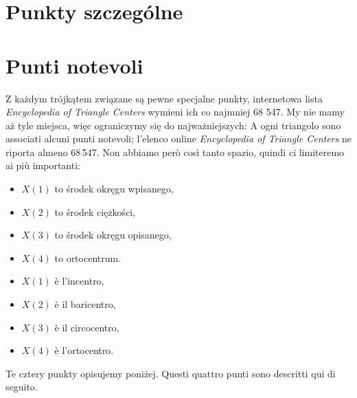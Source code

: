 
%

\section{Punkty szczególne} %
\section{Punti notevoli} %

Z każdym trójkątem związane są pewne specjalne punkty, internetowa lista \emph{Encyclopedia of Triangle Centers} wymieni ich co najmniej 68 547. %
My nie mamy aż tyle miejsca, więc ograniczymy się do najważniejszych: %
A ogni triangolo sono associati alcuni punti notevoli; l'elenco online \emph{Encyclopedia of Triangle Centers} ne riporta almeno 68\,547. %
Non abbiamo però così tanto spazio, quindi ci limiteremo ai più importanti: %
\begin{itemize}
\item $X(1)$ to środek okręgu wpisanego, %
\item $X(2)$ to środek ciężkości, %
\item $X(3)$ to środek okręgu opisanego, %
\item $X(4)$ to ortocentrum. %
\item $X(1)$ è l'incentro, %
\item $X(2)$ è il baricentro, %
\item $X(3)$ è il circocentro, %
\item $X(4)$ è l'ortocentro. %
\end{itemize}
Te cztery punkty opisujemy poniżej. %
Questi quattro punti sono descritti qui di seguito. %

